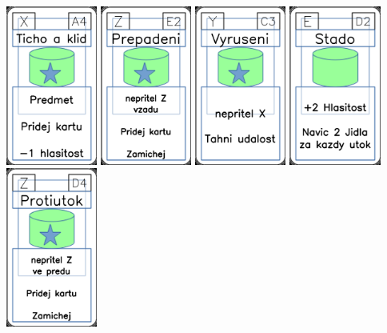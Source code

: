 \documentclass[a4paper]{article}
\begin{document}
	\includegraphics[width=3.0cm]{img-5_3}
	\includegraphics[width=3.0cm]{img-5_51}
	\includegraphics[width=3.0cm]{img-5_42}
	\includegraphics[width=3.0cm]{img-4_46}
	\includegraphics[width=3.0cm]{img-5_48}
\end{document}
